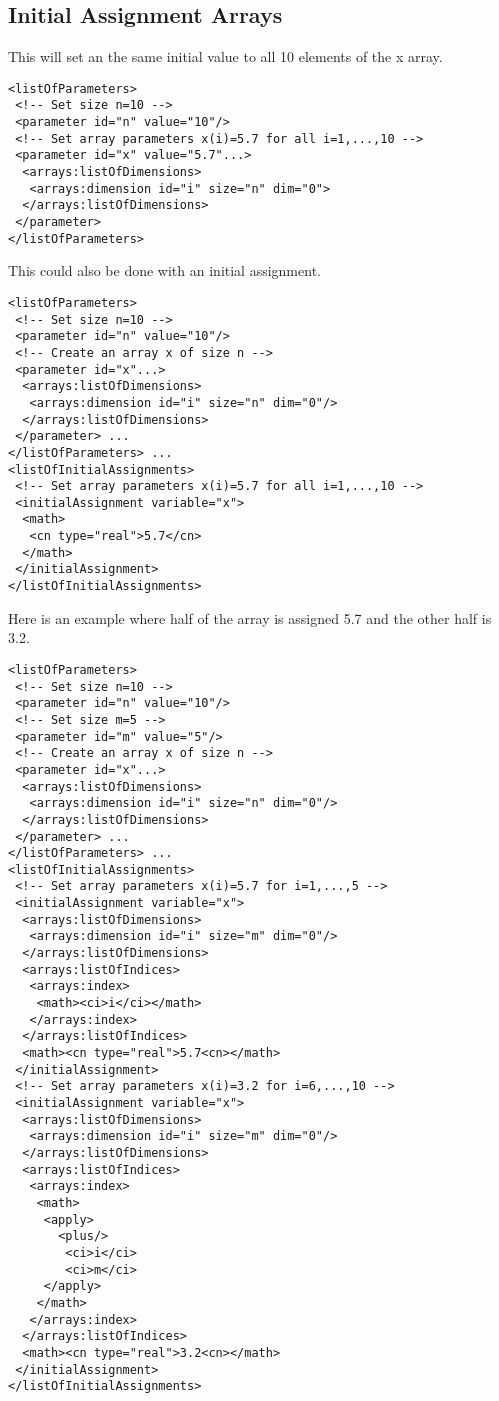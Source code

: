 \subsection{Initial Assignment Arrays}

This will set an the same initial value to all 10 elements of the x array.

\begin{verbatim}
<listOfParameters>
 <!-- Set size n=10 -->
 <parameter id="n" value="10"/>
 <!-- Set array parameters x(i)=5.7 for all i=1,...,10 -->
 <parameter id="x" value="5.7"...>
  <arrays:listOfDimensions>
   <arrays:dimension id="i" size="n" dim="0">
  </arrays:listOfDimensions> 
 </parameter>
</listOfParameters>
\end{verbatim}

This could also be done with an initial assignment.

\begin{verbatim}
<listOfParameters> 
 <!-- Set size n=10 -->
 <parameter id="n" value="10"/>
 <!-- Create an array x of size n -->
 <parameter id="x"...>
  <arrays:listOfDimensions>
   <arrays:dimension id="i" size="n" dim="0"/> 
  </arrays:listOfDimensions>
 </parameter> ...
</listOfParameters> ...
<listOfInitialAssignments>
 <!-- Set array parameters x(i)=5.7 for all i=1,...,10 -->
 <initialAssignment variable="x">
  <math>
   <cn type="real">5.7</cn>
  </math>
 </initialAssignment>
</listOfInitialAssignments>
\end{verbatim}

Here is an example where half of the array is assigned 5.7 and the other half is 3.2. 

\begin{verbatim}
<listOfParameters> 
 <!-- Set size n=10 -->
 <parameter id="n" value="10"/>
 <!-- Set size m=5 -->
 <parameter id="m" value="5"/>
 <!-- Create an array x of size n -->
 <parameter id="x"...>
  <arrays:listOfDimensions>
   <arrays:dimension id="i" size="n" dim="0"/> 
  </arrays:listOfDimensions>
 </parameter> ...
</listOfParameters> ...
<listOfInitialAssignments>
 <!-- Set array parameters x(i)=5.7 for i=1,...,5 -->
 <initialAssignment variable="x"> 
  <arrays:listOfDimensions>
   <arrays:dimension id="i" size="m" dim="0"/>
  </arrays:listOfDimensions>
  <arrays:listOfIndices>
   <arrays:index>
    <math><ci>i</ci></math>
   </arrays:index>
  </arrays:listOfIndices>
  <math><cn type="real">5.7<cn></math>
 </initialAssignment>
 <!-- Set array parameters x(i)=3.2 for i=6,...,10 -->
 <initialAssignment variable="x">
  <arrays:listOfDimensions>
   <arrays:dimension id="i" size="m" dim="0"/>
  </arrays:listOfDimensions>
  <arrays:listOfIndices>
   <arrays:index>
    <math>
     <apply>
       <plus/>
        <ci>i</ci>
        <ci>m</ci>
     </apply>
    </math>
   </arrays:index>
  </arrays:listOfIndices>
  <math><cn type="real">3.2<cn></math>
 </initialAssignment>
</listOfInitialAssignments>
\end{verbatim}

